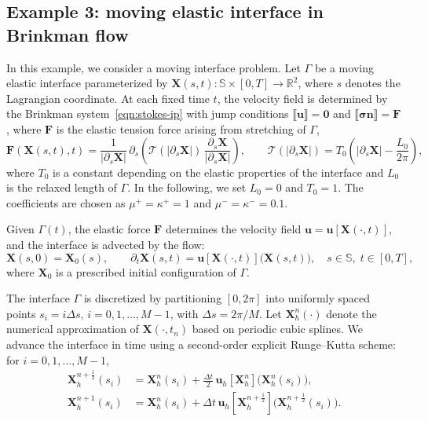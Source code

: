 \documentclass[preprint,11pt]{elsarticle}
\theoremstyle{remark}
\newcommand{\jump}[1]{\llbracket#1\rrbracket}
\newcommand{\mc}[1]{\mathcal{#1}}
\newcommand{\bm}[1]{\boldsymbol{#1}}
\begin{document}
\subsection{Example 3: moving elastic interface in Brinkman flow}
In this example, we consider a moving interface problem.
Let $\Gamma$ be a moving elastic interface parameterized by 
$\bm X(s, t): \mathbb S\times [0,T]\to \mathbb R^2$, 
where $s$ denotes the Lagrangian coordinate.
At each fixed time $t$, the velocity field is determined by the Brinkman system~\eqref{eqn:stokes-ip}
with jump conditions $\jump{\bm u}  = \bm 0$ and $\jump{\bm\sigma \bm n}  = \bm F$, 
where $\bm F$ is the elastic tension force arising from stretching of $\Gamma$,
\begin{equation}\label{eqn:els-force}
    \bm F(\bm X(s,t), t) 
    = \frac{1}{|\partial_s \bm X|}\,\partial_{s}\!\left(\mc T(|\partial_s \bm X|)\,\frac{\partial_s \bm X}{|\partial_s \bm X|}\right), 
    \qquad 
    \mc T(|\partial_s \bm X|) = T_0\left( |\partial_s \bm X| - \frac{L_0}{2\pi}\right),
\end{equation}
where $T_0$ is a constant depending on the elastic properties of the interface and $L_0$ is the relaxed length of $\Gamma$.
In the following, we set $L_0 = 0$ and $T_0 = 1$.
The coefficients are chosen as $\mu^+ = \kappa^+ = 1$ and $\mu^- = \kappa^- = 0.1$.

Given $\Gamma(t)$, the elastic force $\bm F$ determines the velocity field 
$\bm u = \bm u[\bm X(\cdot, t)]$, and the interface is advected by the flow:
\begin{equation}
    \bm X(s,0) = \bm X_0(s), \qquad 
    \partial_t \bm X(s, t) = \bm u[\bm X(\cdot, t)]\bigl(\bm X(s,t)\bigr), 
    \quad s\in \mathbb S,\; t\in[0,T],
\end{equation}
where $\bm X_0$ is a prescribed initial configuration of $\Gamma$.

The interface $\Gamma$ is discretized by partitioning $[0,2\pi]$ into uniformly spaced points 
$s_i = i\Delta s$, $i=0,1,\ldots,M-1$, with $\Delta s = 2\pi / M$.
Let $\bm X_h^n(\cdot)$ denote the numerical approximation of $\bm X(\cdot, t_n)$ based on periodic cubic splines.
We advance the interface in time using a second-order explicit Runge–Kutta scheme: for $i=0,1,\ldots,M-1$,
\begin{equation}
\begin{aligned}
    \bm X_h^{n+\frac{1}{2}}(s_i) &= \bm X_h^n(s_i) 
        + \frac{\Delta t}{2}\,\bm u_h[\bm X_h^n]\bigl(\bm X_h^n(s_i)\bigr),\\ 
    \bm X_h^{n+1}(s_i) &= \bm X_h^n(s_i) 
        + \Delta t\,\bm u_h[\bm X_h^{n+\frac{1}{2}}]\bigl(\bm X_h^{n+\frac{1}{2}}(s_i)\bigr).
\end{aligned}    
\end{equation}
\end{document}
